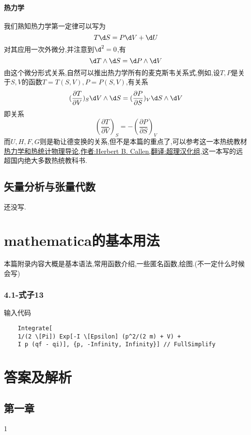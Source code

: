 \subsubsection{热力学}
我们熟知热力学第一定律可以写为
\begin{equation}
    T\d S=P\d V+\d U
\end{equation}
对其应用一次外微分,并注意到$\d^2=0$,有
\begin{equation}
    \d T\wedge\d S=\d P\wedge\d V
\end{equation}
由这个微分形式关系,自然可以推出热力学所有的麦克斯韦关系式,例如,设$ T,P $是关于$S,V$的函数$T=T(S,V),P=P(S,V)$,有关系
\begin{equation}
    (\frac{\partial T}{\partial V})_{S} \d V \wedge \d S = (\frac{\partial P}{\partial S})_{V} \d S \wedge \d V
\end{equation}
即关系
\begin{equation}
    (\frac{\partial T}{\partial V})_{S} = - (\frac{\partial P}{\partial S})_{V}
\end{equation}
而$U,H,F,G$则是勒让德变换的关系,但不是本篇的重点了,可以参考这一本热统教材\href{https://chaoli.club/index.php/attachment/59a781504bce2_CallenThermo.pdf/download}{热力学和热统计物理导论,作者:Herbert B. Callen,翻译:超理汉化组},这一本写的远超国内绝大多数热统教科书.
\section{矢量分析与张量代数}
还没写.
\chapter{mathematica的基本用法}
本篇附录内容大概是基本语法,常用函数介绍,一些匿名函数,绘图.(不一定什么时候会写)
\subsection*{4.1-式子13}
输入代码
\begin{lstlisting}
    Integrate[
    1/(2 \[Pi]) Exp[-I \[Epsilon] (p^2/(2 m) + V) + 
    I p (qf - qi)], {p, -Infinity, Infinity}] // FullSimplify
\end{lstlisting}

\chapter{答案及解析}
\section{第一章}
1
